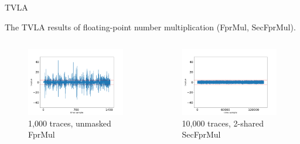 \begin{frame}{TVLA}

The TVLA results of floating-point number multiplication (FprMul, SecFprMul).

\begin{columns}[T]
\begin{figure}
\includegraphics[width=\textwidth]{Figure/tvla-F4-CHES/fpr_mul_1k.png}
\vspace{-20pt}
\caption{1,000 traces, unmasked FprMul}
\end{figure}

\begin{figure}
\includegraphics[width=\textwidth]{figure/tvla-F4-CHES/SecFprMul_2shares_10k.png}
\vspace{-20pt}
\caption{10,000 traces, 2-shared SecFprMul}
\end{figure}


\end{columns}
\end{frame}
